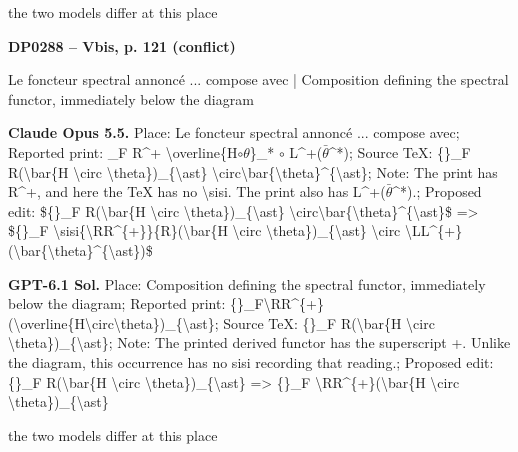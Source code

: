 the two models differ at this place\par
\par\noindent\hypertarget{DP0288}{}\textbf{DP0288 -- Vbis, p. 121 (conflict)}\par
Le foncteur spectral annoncé ... compose avec | Composition defining the spectral functor, immediately below the diagram\par
\textbf{Claude Opus 5.5.} Place: Le foncteur spectral annoncé ... compose avec; Reported print: \_F R\textasciicircum{}+ \textbackslash{}overline\{H\ensuremath{\circ}\ensuremath{\theta}\}\_* \ensuremath{\circ} L\textasciicircum{}+(\ensuremath{\bar{\theta}}\textasciicircum{}*); Source TeX: \{\}\_F R(\textbackslash{}bar\{H \textbackslash{}circ \textbackslash{}theta\})\_\{\textbackslash{}ast\} \textbackslash{}circ\textbackslash{}bar\{\textbackslash{}theta\}\textasciicircum{}\{\textbackslash{}ast\}; Note: The print has R\textasciicircum{}+, and here the TeX has no \textbackslash{}sisi. The print also has L\textasciicircum{}+(\ensuremath{\bar{\theta}}\textasciicircum{}*).; Proposed edit: \$\{\}\_F R(\textbackslash{}bar\{H \textbackslash{}circ \textbackslash{}theta\})\_\{\textbackslash{}ast\} \textbackslash{}circ\textbackslash{}bar\{\textbackslash{}theta\}\textasciicircum{}\{\textbackslash{}ast\}\$ =\allowbreak > \$\{\}\_F \textbackslash{}sisi\{\textbackslash{}RR\textasciicircum{}\{+\}\}\{R\}(\textbackslash{}bar\{H \textbackslash{}circ \textbackslash{}theta\})\_\{\textbackslash{}ast\} \textbackslash{}circ \textbackslash{}LL\textasciicircum{}\{+\}(\textbackslash{}bar\{\textbackslash{}theta\}\textasciicircum{}\{\textbackslash{}ast\})\$\par
\textbf{GPT-6.1 Sol.} Place: Composition defining the spectral functor, immediately below the diagram; Reported print: \{\}\_F\textbackslash{}RR\textasciicircum{}\{+\}(\textbackslash{}overline\{H\textbackslash{}circ\textbackslash{}theta\})\_\{\textbackslash{}ast\}; Source TeX: \{\}\_F R(\textbackslash{}bar\{H \textbackslash{}circ \textbackslash{}theta\})\_\{\textbackslash{}ast\}; Note: The printed derived functor has the superscript +. Unlike the diagram, this occurrence has no sisi recording that reading.; Proposed edit: \{\}\_F R(\textbackslash{}bar\{H \textbackslash{}circ \textbackslash{}theta\})\_\{\textbackslash{}ast\} =\allowbreak > \{\}\_F \textbackslash{}RR\textasciicircum{}\{+\}(\textbackslash{}bar\{H \textbackslash{}circ \textbackslash{}theta\})\_\{\textbackslash{}ast\}\par
the two models differ at this place\par
